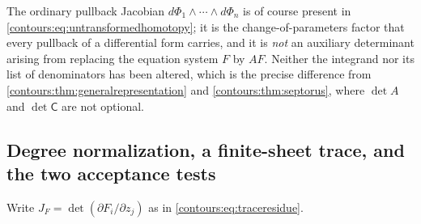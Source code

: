 \documentclass[11pt,letterpaper]{article}
\theoremstyle{definition}
\theoremstyle{remark}
\numberwithin{equation}{section}
\begin{document}
The ordinary pullback Jacobian $d\Phi_1\wedge\cdots\wedge d\Phi_n$ is of course
present in \eqref{contours:eq:untransformedhomotopy}; it is the
change-of-parameters factor that every pullback of a differential form carries,
and it is \emph{not} an auxiliary determinant arising from replacing the equation
system $F$ by $AF$. Neither the integrand nor its list of denominators has been
altered, which is the precise difference from
\cref{contours:thm:generalrepresentation} and
\cref{contours:thm:septorus}, where $\det A$ and $\det\mathsf C$ are not
optional.

\subsection{Degree normalization, a finite-sheet trace, and the two acceptance
tests}
\label{contours:subsec:normalization}
Write $J_F=\det(\partial F_i/\partial z_j)$ as in
\eqref{contours:eq:traceresidue}.
\end{document}
